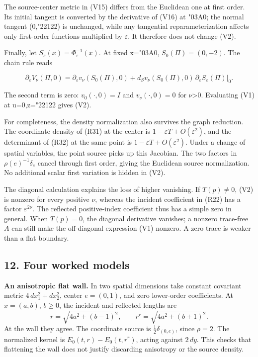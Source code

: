 \documentclass[
  11pt,
]{article}
\begin{document}
The source-center metric in (V15) differs from the Euclidean one at
first order. Its initial tangent is converted by the derivative of (V16)
at {\ReaderSymbols\char"03A0}; the normal tangent (0,{\ReaderSymbols\char"2212}2) is unchanged, while any tangential
reparameterization affects only first-order functions multiplied by \ensuremath{\varepsilon}.
It therefore does not change (V2).

Finally, let \(S_\varepsilon(x)=\Phi_\varepsilon^{-1}(x)\). At fixed
x={\ReaderSymbols\char"03A0}, \(S_0(\Pi)=(0,-2)\). The chain rule reads

\[
 \partial_\varepsilon V_\nu(\Pi,0)
 =\partial_\varepsilon v_\nu(S_0(\Pi),0)
  +d_Sv_\nu(S_0(\Pi),0)\,
                  \partial_\varepsilon S_\varepsilon(\Pi)|_0.
\]

The second term is zero: \(v_0(\cdot,0)=I\) and \(v_\nu(\cdot,0)=0\) for
\ensuremath{\nu}\textgreater0. Evaluating (V1) at u=0,z={\ReaderSymbols\char"2212}2 gives (V2).

For completeness, the density normalization also survives the graph
reduction. The coordinate density of (R31) at the center is
\(1-\varepsilon T+O(\varepsilon^2)\), and the determinant of (R32) at
the same point is \(1-\varepsilon T+O(\varepsilon^2)\). Under a change
of spatial variables, the point source picks up this Jacobian. The two
factors in \(\rho(e)^{-1}\delta_e\) cancel through first order, giving
the Euclidean source normalization. No additional scalar first variation
is hidden in (V2).

The diagonal calculation explains the loss of higher vanishing. If
\(T(p)\ne0\), (V2) is nonzero for every positive \(\nu\), whereas the
incident coefficient in (R22) has a factor \(\varepsilon^{2\nu}\). The
reflected positive-index coefficient thus has a simple zero in general.
When \(T(p)=0\), the diagonal derivative vanishes; a nonzero trace-free
\(A\) can still make the off-diagonal expression (V1) nonzero. A zero
trace is weaker than a flat boundary.

\subsection{12. Four worked models}\label{four-worked-models}

\textbf{An anisotropic flat wall.} In two spatial dimensions take
constant covariant metric \(4\,dx_1^2+dx_2^2\), center \(e=(0,1)\), and
zero lower-order coefficients. At \(x=(a,b)\), \(b\geq0\), the incident
and reflected lengths are \[
 r=\sqrt{4a^2+(b-1)^2},\qquad
 r^r=\sqrt{4a^2+(b+1)^2}.                                  \tag{R34}
\] At the wall they agree. The coordinate source is
\(\tfrac12\delta_{(0,e)}\), since \(\rho=2\). The normalized kernel is
\(E_0(t,r)-E_0(t,r^r)\), acting against \(2\,dy\). This checks that
flattening the wall does not justify discarding anisotropy or the source
density.
\end{document}
